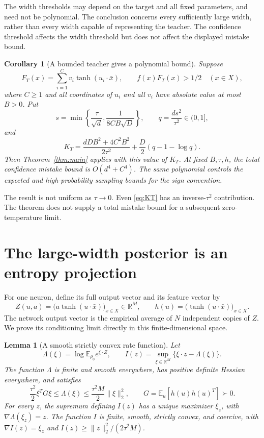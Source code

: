 \documentclass[11pt]{article}
\newtheorem{lemma}[theorem]{Lemma}
\newtheorem{corollary}[theorem]{Corollary}
\newcommand{\R}{\mathbb R}
\newcommand{\E}{\mathbb E}
\begin{document}
The width thresholds may depend on the target and all fixed parameters,
and need not be polynomial. The conclusion concerns every sufficiently
large width, rather than every width capable of representing the teacher.
The confidence threshold affects the width threshold but does not affect
the displayed mistake bound.

\begin{corollary}[A bounded teacher gives a polynomial bound]\label{cor:teacher}
Suppose
\[
 F_T(x)=\sum_{i=1}^C v_i\tanh(u_i\cdot\bar x),\qquad
 f(x)F_T(x)>1/2\quad(x\in X),
\]
where $C\ge1$ and all coordinates of $u_i$ and all $v_i$ have absolute
value at most $B>0$. Put
\begin{equation}\label{eq:sq}
 s=\min\left\{\frac{\tau}{\sqrt d},\frac1{8CB\sqrt D}\right\},
 \qquad q=\frac{ds^2}{\tau^2}\in(0,1],
\end{equation}
and
\begin{equation}\label{eq:KT}
 K_T=\frac{dDB^2+4C^2B^2}{2\tau^2}
       +\frac D2(q-1-\log q).
\end{equation}
Then Theorem~\ref{thm:main} applies with this value of $K_T$. At fixed
$B,\tau,h$, the total confidence mistake bound is $O(d^4+C^4)$.
The same polynomial controls the expected and high-probability sampling
bounds for the sign convention.
\end{corollary}

The result is not uniform as $\tau\to0$. Even \eqref{eq:KT} has an
inverse-$\tau^2$ contribution. The theorem does not supply a total
mistake bound for a subsequent zero-temperature limit.

\section{The large-width posterior is an entropy projection}

For one neuron, define its full output vector and its feature vector by
\[
 Z(u,a)=\big(a\tanh(u\cdot\bar x)\big)_{x\in X}\in\R^M,
 \qquad h(u)=\big(\tanh(u\cdot\bar x)\big)_{x\in X}.
\]
The network output vector is the empirical average of $N$ independent
copies of $Z$. We prove its conditioning limit directly in this
finite-dimensional space.

\begin{lemma}[A smooth strictly convex rate function]\label{lem:rate}
Let
\[
 \Lambda(\xi)=\log\E_{\rho_0}e^{\xi\cdot Z},\qquad
 I(z)=\sup_{\xi\in\R^M}\{\xi\cdot z-\Lambda(\xi)\}.
\]
The function $\Lambda$ is finite and smooth everywhere, has positive
definite Hessian everywhere, and satisfies
\begin{equation}\label{eq:Lambda}
 \frac{\tau^2}{2}\xi^TG\xi\le\Lambda(\xi)
 \le\frac{\tau^2M}{2}\|\xi\|_2^2,
 \qquad G=\E_u[h(u)h(u)^T]\succ0.
\end{equation}
For every $z$, the supremum defining $I(z)$ has a unique maximizer
$\xi_z$, with $\nabla\Lambda(\xi_z)=z$. The function $I$ is finite,
smooth, strictly convex, and coercive, with $\nabla I(z)=\xi_z$ and
$I(z)\ge\|z\|_2^2/(2\tau^2M)$.
\end{lemma}
\end{document}
